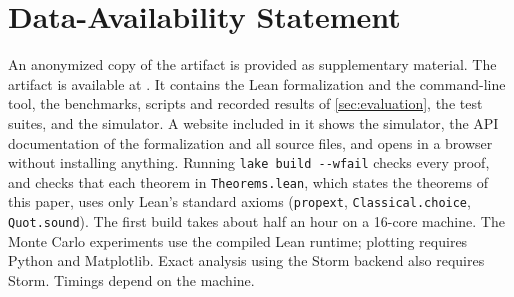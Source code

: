 \section*{Data-Availability Statement}

\ifleananonymous
  An anonymized copy of the artifact is provided as supplementary material.
\else
  The artifact is available at \artifactlink.
\fi
It contains the Lean formalization and the command-line tool, the benchmarks, scripts and
recorded results of \cref{sec:evaluation}, the test suites, and the simulator. A website included
in it shows the simulator, the API documentation of the formalization and all source files, and
opens in a browser without installing anything.
Running \texttt{lake build -{}-wfail} checks every proof, and checks that each theorem in
\texttt{Theorems.lean}, which states the theorems of this paper, uses only Lean's standard axioms
(\texttt{propext}, \texttt{Classical.choice}, \texttt{Quot.sound}). The first build takes about
half an hour on a 16-core machine.
The Monte Carlo experiments use the compiled Lean runtime; plotting
requires Python and Matplotlib. Exact analysis using the Storm backend
also requires Storm. Timings depend on the machine.
